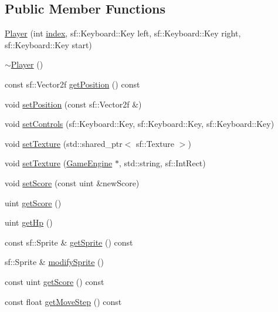 \subsection*{Public Member Functions}
\begin{DoxyCompactItemize}
\item 
\mbox{\hyperlink{class_player_aa1b5d40a7f5e26c7588b64ec515d7de7}{Player}} (int \mbox{\hyperlink{class_player_a1d1f9fee5f774351292af1d0cfa7d65c}{index}}, sf\+::\+Keyboard\+::\+Key left, sf\+::\+Keyboard\+::\+Key right, sf\+::\+Keyboard\+::\+Key start)
\item 
\mbox{\hyperlink{class_player_a749d2c00e1fe0f5c2746f7505a58c062}{$\sim$\+Player}} ()
\item 
const sf\+::\+Vector2f \mbox{\hyperlink{class_player_a6599dac14c1f2ac94e9160c99376333e}{get\+Position}} () const
\item 
void \mbox{\hyperlink{class_player_a9f37a6ecb0abbea3eed1348266135879}{set\+Position}} (const sf\+::\+Vector2f \&)
\item 
void \mbox{\hyperlink{class_player_ab9820af1d231f97e0499b70ed6b34196}{set\+Controls}} (sf\+::\+Keyboard\+::\+Key, sf\+::\+Keyboard\+::\+Key, sf\+::\+Keyboard\+::\+Key)
\item 
void \mbox{\hyperlink{class_player_a7f5f3ce419bc062ab59b6f689c24a5a6}{set\+Texture}} (std\+::shared\+\_\+ptr$<$ sf\+::\+Texture $>$)
\item 
void \mbox{\hyperlink{class_player_a7d0ef1fb581ee3cc89f85c50c9c2c9ad}{set\+Texture}} (\mbox{\hyperlink{class_game_engine}{Game\+Engine}} $\ast$, std\+::string, sf\+::\+Int\+Rect)
\item 
void \mbox{\hyperlink{class_player_a8053d861a3d9d0f91fd7e35a38e7ce14}{set\+Score}} (const uint \&new\+Score)
\item 
uint \mbox{\hyperlink{class_player_a7ecb56acd6bf6d77bbc3ff7f3d8cf7d8}{get\+Score}} ()
\item 
uint \mbox{\hyperlink{class_player_ad9329ace9778fed6665610d53842f37a}{get\+Hp}} ()
\item 
const sf\+::\+Sprite \& \mbox{\hyperlink{class_player_aa84e6c6cc5f2f263b9ff9841286d8c42}{get\+Sprite}} () const
\item 
sf\+::\+Sprite \& \mbox{\hyperlink{class_player_af61ca52f651c2be22d1606a031d919eb}{modify\+Sprite}} ()
\item 
const uint \mbox{\hyperlink{class_player_a5e084d1d883eeade8a73df72cdd855be}{get\+Score}} () const
\item 
const float \mbox{\hyperlink{class_player_afb255210e4ca1d463c18b4a5aa26a1e0}{get\+Move\+Step}} () const

\end{DoxyCompactItemize}
